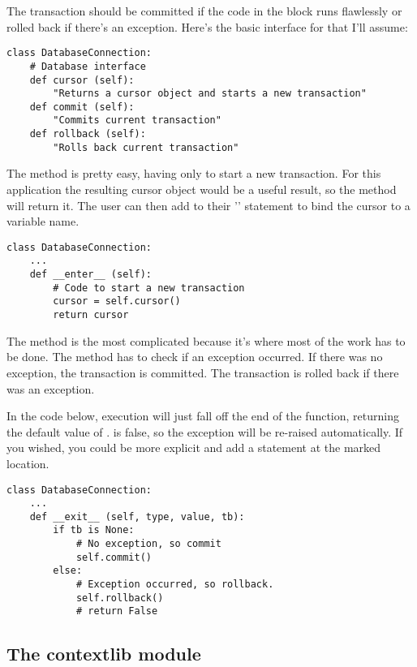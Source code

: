 \documentclass{howto}
\begin{document}
The transaction should be committed if the code in the block
runs flawlessly or rolled back if there's an exception.
Here's the basic interface
for  that I'll assume:

\begin{verbatim}
class DatabaseConnection:
    # Database interface
    def cursor (self):
        "Returns a cursor object and starts a new transaction"
    def commit (self):
        "Commits current transaction"
    def rollback (self):
        "Rolls back current transaction"
\end{verbatim}

The  method is pretty easy, having only to start
a new transaction.  For this application the resulting cursor object
would be a useful result, so the method will return it.  The user can
then add  to their '' statement to bind
the cursor to a variable name.

\begin{verbatim}
class DatabaseConnection:
    ...
    def __enter__ (self):
        # Code to start a new transaction
        cursor = self.cursor()
        return cursor
\end{verbatim}

The  method is the most complicated because it's
where most of the work has to be done.  The method has to check if an
exception occurred.  If there was no exception, the transaction is
committed.  The transaction is rolled back if there was an exception.

In the code below, execution will just fall off the end of the
function, returning the default value of .   is
false, so the exception will be re-raised automatically.  If you
wished, you could be more explicit and add a 
statement at the marked location.

\begin{verbatim}
class DatabaseConnection:
    ...
    def __exit__ (self, type, value, tb):
        if tb is None:
            # No exception, so commit
            self.commit()
        else:
            # Exception occurred, so rollback.
            self.rollback()
            # return False
\end{verbatim}


\subsection{The contextlib module\label{module-contextlib}}
\end{document}
